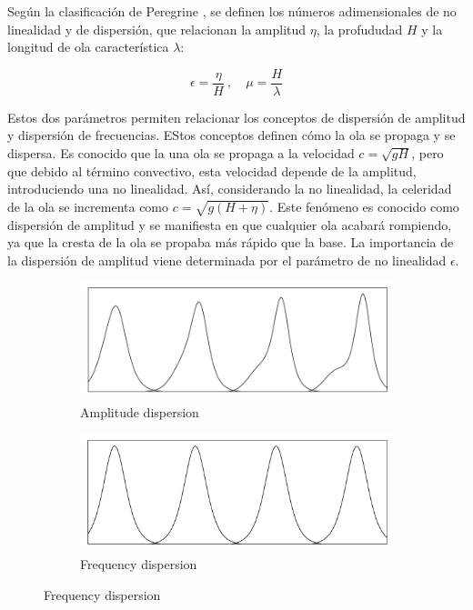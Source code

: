 Según la clasificación de Peregrine \cite{peregrine1967}, se definen los números adimensionales de no linealidad y de dispersión, que relacionan la amplitud $\eta$, la profududad $H$ y la longitud de ola característica $\lambda$:

\begin{equation}
    \epsilon = \frac{\eta}{H} \ ,\quad \mu = \frac{H}{\lambda}
    \label{nonlin_disp_ratios}
\end{equation}

Estos dos parámetros permiten relacionar los conceptos de dispersión de amplitud y dispersión de frecuencias. EStos conceptos definen cómo la ola se propaga y se dispersa. Es conocido que la una ola se propaga a la velocidad $c=\sqrt{gH}$, pero que debido al término convectivo, esta velocidad depende de la amplitud, introduciendo una no linealidad. Así, considerando la no linealidad, la celeridad de la ola se incrementa como $c=\sqrt{g(H+\eta)}$. Este fenómeno es conocido como dispersión de amplitud y se manifiesta en que cualquier ola acabará rompiendo, ya que la cresta de la ola se propaba más rápido que la base. La importancia de la dispersión de amplitud viene determinada por el parámetro de no linealidad $\epsilon$.


\begin{figure}
\begin{subfigure}{\textwidth}
    \centering
    \includegraphics[width=.9\textwidth]{img/boussinesq low dispersion.png}
    \caption{Amplitude dispersion}
    \label{ampl_dispersion}
\end{subfigure}
\begin{subfigure}{\textwidth}
    \centering
    \includegraphics[width=.9\textwidth]{img/boussinesq.pdf}
    \caption{Frequency dispersion}
    \label{freq_dispersion}
\end{subfigure}
\end{figure}

